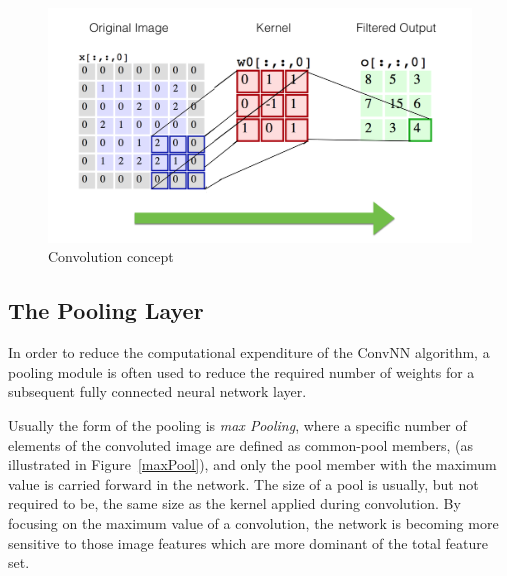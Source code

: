 \documentclass[letterpaper,12pt]{article}
\newcommand{\figref}[1]{Figure~\ref{#1}}
\begin{document}
\begin{figure}[htbp]
\begin{center}
\includegraphics[scale=0.7]{images/convolution.png}
\caption{Convolution concept \cite{cs231}}
\label{conv}
\end{center}
\end{figure}

\subsection{The Pooling Layer}

In order to reduce the computational expenditure of the ConvNN algorithm, a pooling module is often used to reduce the required number of weights for a subsequent fully connected neural network layer.  

Usually the form of the pooling is \textit{max Pooling}, where  a specific number of elements of the convoluted image are defined as common-pool members, (as illustrated in \figref{maxPool}), and only the pool member with the maximum value is carried forward in the network. The size of a pool is usually, but not required to be, the same size as the kernel applied during convolution. By focusing on the maximum value of a convolution, the network is becoming more sensitive to those image features which are more dominant of the total feature set.
\end{document}
